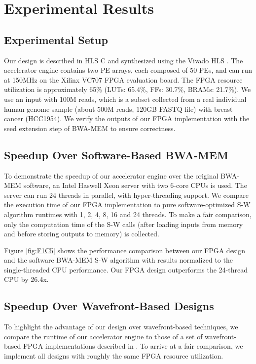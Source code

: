 \section{Experimental Results} 
\label{sec:results}

\subsection{Experimental Setup}

Our design is described in HLS C and synthesized using the Vivado HLS \cite{HLS2011}.
The accelerator engine contains two PE arrays, each composed of 50 PEs, and can run at 150MHz on the Xilinx VC707 FPGA evaluation board.
The FPGA resource utilization is approximately 65\% (LUTs: 65.4\%, FFs: 30.7\%, BRAMs: 21.7\%). 
We use an input with 100M reads, which is a subset collected from a real individual human genome sample (about 500M reads, 120GB FASTQ file) with breast cancer (HCC1954). 
We verify the outputs of our FPGA implementation with the seed extension step of BWA-MEM to ensure correctness. 

\subsection{Speedup Over Software-Based BWA-MEM}

To demonstrate the speedup of our accelerator engine over the original BWA-MEM software, 
an Intel Haswell Xeon server with two 6-core CPUs is used.
The server can run 24 threads in parallel, with hyper-threading support.
We compare the execution time of our FPGA implementation to pure software-optimized S-W algorithm runtimes with 1, 2, 4, 8, 16 and 24 threads.
To make a fair comparison, only the computation time of the S-W calls (after loading inputs from memory and before storing outputs to memory) is collected.

Figure \ref{fig:F1C5} shows the performance comparison between our FPGA design and the software BWA-MEM S-W algorithm with results normalized to the single-threaded CPU performance.
Our FPGA design outperforms the 24-thread CPU by 26.4x.

\subsection{Speedup Over Wavefront-Based Designs}

To highlight the advantage of our design over wavefront-based techniques, 
we compare the runtime of our accelerator engine to those of a set of wavefront-based FPGA implementations described in \cite{Zhang2007}. To arrive at a fair comparison, we implement all designs with roughly the same FPGA resource utilization.

